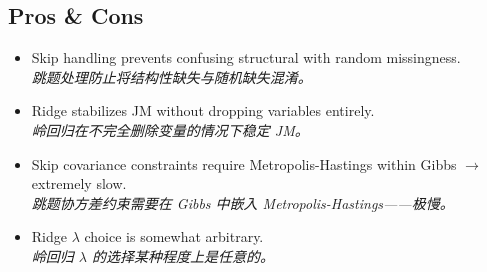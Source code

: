\documentclass[9pt, a4paper]{article}
\begin{document}
\subsection{Pros \& Cons}
\begin{tcolorbox}[prosbox]
    \begin{itemize}
        \item [\ding{51}] Skip handling prevents confusing structural with random missingness.\\
        \textit{跳题处理防止将结构性缺失与随机缺失混淆。}
        \item [\ding{51}] Ridge stabilizes JM without dropping variables entirely.\\
        \textit{岭回归在不完全删除变量的情况下稳定 JM。}
    \end{itemize}
\end{tcolorbox}
\begin{tcolorbox}[consbox]
    \begin{itemize}
        \item [\ding{55}] Skip covariance constraints require Metropolis-Hastings within Gibbs $\to$ extremely slow.\\
        \textit{跳题协方差约束需要在 Gibbs 中嵌入 Metropolis-Hastings——极慢。}
        \item [\ding{55}] Ridge $\lambda$ choice is somewhat arbitrary.\\
        \textit{岭回归 $\lambda$ 的选择某种程度上是任意的。}
    \end{itemize}
\end{tcolorbox}
\end{document}
